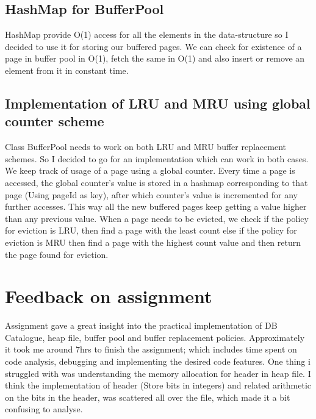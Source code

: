 \documentclass{article}
\begin{document}
\begin{titlepage}
\subsection{HashMap for BufferPool}
HashMap provide O(1) access for all the elements in the data-structure so I decided to use it for storing our buffered pages. We can check for existence of a page in buffer pool in O(1), fetch the same in O(1) and also insert or remove an element from it in constant time.
 
\subsection{Implementation of LRU and MRU using global counter scheme}
Class BufferPool needs to work on both LRU and MRU buffer replacement schemes. So I decided to go for an implementation which can work in both cases. We keep track of usage of a page using a global counter. Every time a page is accessed, the global counter's value is stored in a hashmap corresponding to that page (Using pageId as key), after which counter's value is incremented for any further accesses. This way all the new buffered pages keep getting a value higher than any previous value. When a page needs to be evicted, we check if the policy for eviction is LRU, then find a page with the least count else if the policy for eviction is MRU then find a page with the highest count value and then return the page found for eviction.

\section{Feedback on assignment}
Assignment gave a great insight into the practical implementation of DB Catalogue, heap file, buffer pool and buffer replacement policies. Approximately it took me around 7hrs to finish the assignment; which includes time spent on code analysis, debugging and implementing the desired code features. One thing i struggled with was understanding the memory allocation for header in heap file. I think the implementation of header (Store bits in integers) and related arithmetic on the bits in the header, was scattered all over the file, which made it a bit confusing to analyse. 

\end{titlepage}
\end{document}
